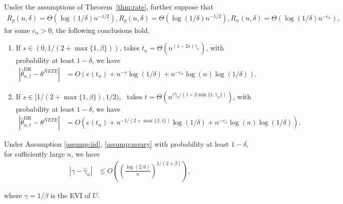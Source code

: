 \documentclass[10pt,a4paper]{amsart}
\begin{document}
\begin{corollary}\label{cor:rate}
Under the assumptions of Theorem~\ref{thm:rate}, further
  suppose that
  \begin{align*}
    R_p (n, \delta) = \Theta (\log (1 / \delta) n^{- 1 / 2}) , R_g (n, \delta) = \Theta (\log (1 / \delta) n^{- 1 / 2}), R_\alpha (n, \delta) = \Theta( \log(1/\delta) n^{-c_\alpha}),
  \end{align*}
  for some $c_\alpha > 0 $, the following conclusions hold.
  \begin{enumerate}
    \item If $s \in (0, 1 / (2 + \max \{1, \beta\}))$, takes $t_n = \Theta (n^{
    (1 - 2 s) \hat{\gamma}_{n}})$, with probability at least $1 - \delta$,
    we have
    \begin{align*}
      | {{\widehat{\theta }_{n, t}^{\text{DR} }} }   - \theta^{NETE} | & = O
      (e (t_n) + n^{- s} \log (1 / \delta) +  n^{-c_\alpha} \log(n)\log (1 / \delta)) .
    \end{align*}
    \item If $s \in [1 / (2 + \max \{1, \beta\}), 1 / 2)$, \ takes $t = \Theta
    (n^{(\hat{\gamma}_{n} / (1 + 2 \min \{1, \hat{\gamma}_{n} \})})$,
    with probability at least $1 - \delta$, we have
    \begin{align*}
      | {{\widehat{\theta }_{n, t}^{\text{DR} }} }   - \theta^{NETE} | & = O
      (e (t_n) + n^{- 1 / (2 + \max \{\beta, 1\})} \log (1 / \delta) +  n^{-c_\alpha} \log(n)\log (1 / \delta)) .
    \end{align*}
  \end{enumerate}
\end{corollary}

\begin{lemma}
  \label{lemma:mu_rate}Under Assumption \ref{assump:iid}, \ref{assump:mvary}
  with probability at least $1 - \delta$, for sufficiently large $n$, we have
  \begin{align*}
    | \gamma - \hat{\gamma}_n | & \leqslant O \left( \left( \frac{\log (2 /
    \delta)}{n} \right)^{1 / (2 + \beta)} \right),
  \end{align*}
  
  where $\gamma = 1 / \beta$ is the EVI of $U$. 
\end{lemma}
\end{document}
